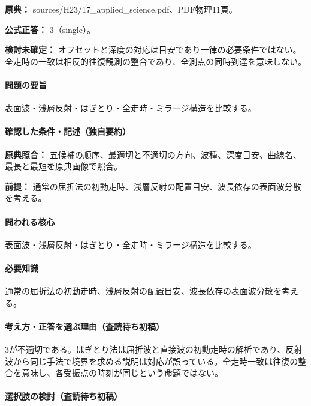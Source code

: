 \noindent\textbf{原典：} sources/H23/17\_applied\_science.pdf、PDF物理11頁。

\textbf{公式正答：} 3（single）。

\par\textbf{検討未確定：} オフセットと深度の対応は目安であり一律の必要条件ではない。全走時の一致は相反的往復観測の整合であり、全測点の同時到達を意味しない。

\paragraph{問題の要旨} 表面波・浅層反射・はぎとり・全走時・ミラージ構造を比較する。

\paragraph{確認した条件・記述（独自要約）}\mbox{}\par

\noindent\textbf{原典照合：} 五候補の順序、最適切と不適切の方向、波種、深度目安、曲線名、最長と最短を原典画像で照合。\par

\noindent\textbf{前提：} 通常の屈折法の初動走時、浅層反射の配置目安、波長依存の表面波分散を考える。\par

\paragraph{問われる核心} 表面波・浅層反射・はぎとり・全走時・ミラージ構造を比較する。

\paragraph{必要知識} 通常の屈折法の初動走時、浅層反射の配置目安、波長依存の表面波分散を考える。

\paragraph{考え方・正答を選ぶ理由（査読待ち初稿）} 3が不適切である。はぎとり法は屈折波と直接波の初動走時の解析であり、反射波から同じ手法で境界を求める説明は対応が誤っている。全走時一致は往復の整合を意味し、各受振点の時刻が同じという命題ではない。

\paragraph{選択肢の検討（査読待ち初稿）}\mbox{}\par

